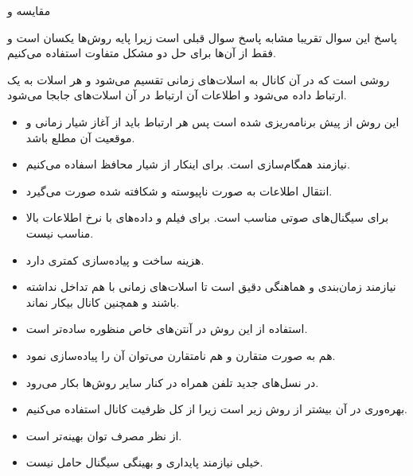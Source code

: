 \SubProblem
{مقایسه  و }
{
پاسخ این سوال تقریبا مشابه پاسخ سوال قبلی است زیرا پایه روش‌ها یکسان است و فقط از آن‌ها برای حل دو مشکل متفاوت استفاده می‌کنیم.

روشی است که در آن کانال به اسلات‌های زمانی تقسیم می‌شود و هر اسلات به یک ارتباط داده می‌شود و اطلاعات آن ارتباط در آن اسلات‌های جابجا می‌شود.

\begin{itemize}
    \item
    این روش از پیش برنامه‌ریزی شده است پس هر ارتباط باید از آغاز شیار زمانی و موقعیت آن مطلع باشد.
    
    \item
    نیازمند همگام‌سازی است. برای اینکار از شیار محافظ اسفاده می‌کنیم.
    
    \item
     انتقال اطلاعات به صورت ناپیوسته و شکافته شده صورت می‌گیرد.
    
    \item
    برای سیگنال‌های صوتی مناسب است. برای فیلم و داده‌های با نرخ اطلاعات بالا مناسب نیست.
    
    \item
    هزینه ساخت و پیاده‌سازی کمتری دارد.

    \item
    نیازمند زمان‌بندی و هماهنگی دقیق است تا اسلات‌های زمانی با هم تداخل نداشته باشند و همچنین کانال بیکار نماند.
    
    \item
    استفاده از این روش در آنتن‌های خاص منظوره ساده‌تر است.
    
    \item
    هم به صورت متقارن و هم نامتقارن می‌توان آن را پیاده‌سازی نمود.
    
    \item
    در نسل‌های جدید تلفن همراه در کنار سایر روش‌ها بکار می‌رود.
    
    \item
    بهره‌وری در آن بیشتر از روش زیر است زیرا از کل ظرفیت کانال استفاده می‌کنیم.
    
    \item
    از نظر مصرف توان بهینه‌تر است.
    
    \item
    خیلی نیازمند پایداری و بهینگی سیگنال حامل نیست.
\end{itemize}

}
